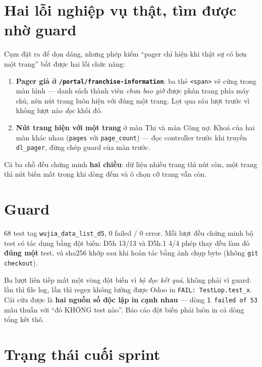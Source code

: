 \section{Hai lỗi nghiệp vụ thật, tìm được nhờ guard}

Cụm đặt ra để dọn dáng, nhưng phép kiểm ``pager chỉ hiện khi thật sự có hơn một trang'' bắt được
hai lỗi chức năng:

\begin{enumerate}
\item \textbf{Pager giả ở \texttt{/portal/franchise-information}}: ba thẻ \texttt{<span>} vẽ cứng
  trong màn hình --- danh sách thành viên \emph{chưa bao giờ} được phân trang phía máy chủ, nên nút
  trang luôn hiện với đúng một trang. Lọt qua sáu lượt trước vì không lượt nào \emph{đọc} khối đó.
\item \textbf{Nút trang hiện với một trang} ở màn Thi và màn Công nợ. Khoá của hai màn khác nhau
  (\texttt{pages} với \texttt{page\_count}) --- đọc controller trước khi truyền \texttt{dl\_pager},
  đừng chép guard của màn trước.
\end{enumerate}

Cả ba chỗ đều chứng minh \textbf{hai chiều}: dữ liệu nhiều trang thì nút còn, một trang thì nút
biến mất trong khi dòng đếm và ô chọn cỡ trang vẫn còn.

\section{Guard}

68 test tag \texttt{wujia\_data\_list\_d5}, 0 failed / 0 error. Mỗi lượt đều chứng minh bộ test có
tác dụng bằng đột biến: D5h 13/13 và D5h.1 4/4 phép thay đều làm đỏ \textbf{đúng một} test, và
sha256 khớp sau khi hoàn tác bằng ảnh chụp byte (không \texttt{git checkout}).

Ba lượt liên tiếp mất một vòng đột biến vì \emph{bộ đọc kết quả}, không phải vì guard: lần thì file
log, lần thì regex không lường được Odoo in \texttt{FAIL: TestLop.test\_x}. Cái cứu được là
\textbf{hai nguồn số độc lập in cạnh nhau} --- dòng \texttt{1 failed of 53} mâu thuẫn với ``đỏ
KHÔNG test nào''. Báo cáo đột biến phải luôn in cả dòng tổng kết thô.

\section{Trạng thái cuối sprint}

